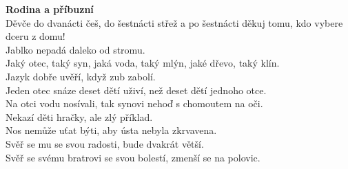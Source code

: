 \begin{multicols}{2}
\noindent
{\large\bf Rodina a příbuzní}\\[1 mm]
Děvče do dvanácti češ, do šestnácti střež a po šestnácti 
děkuj tomu, kdo vybere dceru z domu!\\
Jablko nepadá daleko od stromu.\\
Jaký otec, taký syn, jaká voda, taký mlýn, jaké dřevo, taký klín.\\
Jazyk dobře uvěří, když zub zabolí.\\
Jeden otec snáze deset dětí uživí, než deset dětí jednoho otce.\\
Na otci vodu nosívali, tak synovi nehoď s chomoutem na oči.\\
Nekazí děti hračky, ale zlý příklad.\\
Nos nemůže uťat býti, aby ústa nebyla zkrvavena.\\
Svěř se mu se svou radosti, bude dvakrát větší.\\
Svěř se svému bratrovi se svou bolestí, zmenší se na polovic.\\


\end{multicols}
